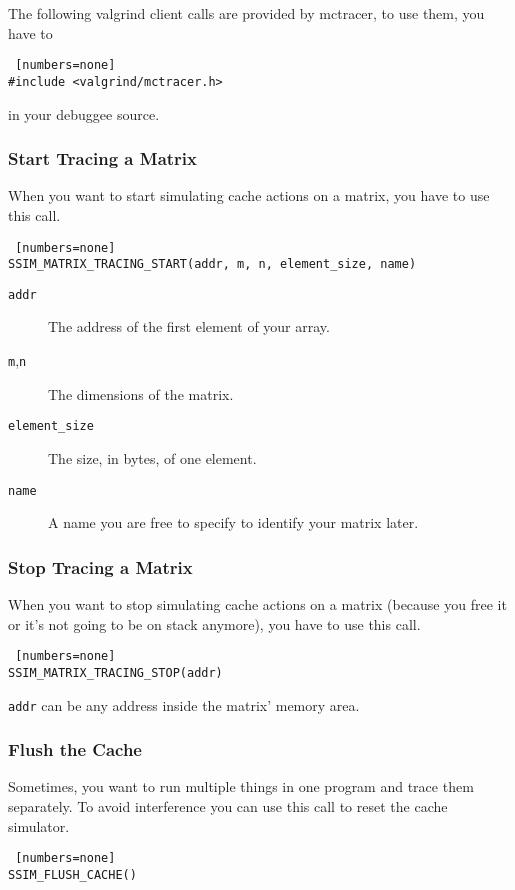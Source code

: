 \lstset{language=C}

The following valgrind client calls are provided by mctracer, to use them, you have to
\begin{lstlisting} [numbers=none]
#include <valgrind/mctracer.h>
\end{lstlisting}
in your debuggee source.

\subsubsection{Start Tracing a Matrix}
When you want to start simulating cache actions on a matrix, you have to use this call.
\begin{lstlisting} [numbers=none]
SSIM_MATRIX_TRACING_START(addr, m, n, element_size, name)
\end{lstlisting}
\begin{description}
\item[\texttt{addr}] The address of the first element of your array.
\item[\texttt{m},\texttt{n}] The dimensions of the matrix.
\item[\texttt{element\_size}] The size, in bytes, of one element.
\item[\texttt{name}] A name you are free to specify to identify your matrix later.
\end{description}


\subsubsection{Stop Tracing a Matrix}
When you want to stop simulating cache actions on a matrix (because you free it or it's not going to be on stack anymore), you have to use this call.
\begin{lstlisting} [numbers=none]
SSIM_MATRIX_TRACING_STOP(addr)
\end{lstlisting}
\texttt{addr} can be any address inside the matrix' memory area.

\subsubsection{Flush the Cache}
Sometimes, you want to run multiple things in one program and trace them separately. To avoid interference you can use this call to reset the cache simulator.
\begin{lstlisting} [numbers=none]
SSIM_FLUSH_CACHE()
\end{lstlisting}

